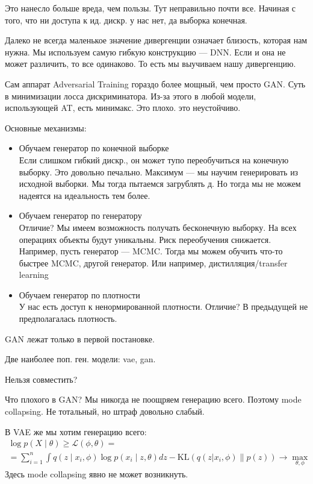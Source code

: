 \documentclass{book}
\begin{document}
Это нанесло больше вреда, чем пользы. Тут неправильно почти все. Начиная с того, что ни доступа к ид. дискр. у нас нет, да выборка конечная.

Далеко не всегда маленькое значение дивергенции означает близость, которая нам нужна. Мы используем самую гибкую конструкцию --- DNN. Если и она не может различить, то все одинаково. То есть мы выучиваем нашу дивергенцию.

Сам аппарат Adversarial Training гораздо более мощный, чем просто GAN. Суть в минимизации лосса дискриминатора. Из-за этого в любой модели, использующей AT, есть минимакс. Это плохо. это неустойчиво.

Основные механизмы:
\begin{itemize}
  \item Обучаем генератор по конечной выборке\\
    Если слишком гибкий дискр., он может тупо переобучиться на конечную выборку. Это довольно печально. Максимум --- мы научим генерировать из исходной выборки. Мы тогда пытаемся загрублять д. Но тогда мы не можем надеятся на идеальность тем более.\\
  \item Обучаем генератор по генератору\\
    Отличие? Мы имеем возможность получать бесконечную выборку. На всех операциях объекты будут уникальны. Риск переобучения снижается. Например, пусть генератор --- MCMC. Тогда мы можем обучить что-то быстрее MCMC, другой генератор. Или например, дистилляция/transfer learning\\
  \item Обучаем генератор по плотности\\
    У нас есть доступ к ненормированной плотности. Отличие? В предыдущей не предполагалась плотность.
\end{itemize}

GAN лежат только в первой постановке.

Две наиболее поп. ген. модели: vae, gan.

Нельзя совместить?

Что плохого в GAN? Мы никогда не поощряем генерацию всего. Поэтому mode collapsing. Не тотальный, но штраф довольно слабый.

В VAE же мы хотим генерацию всего:
\begin{gather*}
  \log p(X\mid \theta) \geq \mathcal{L}(\phi,\theta)=\\
  =\sum_{i=1}^{n} {\int {q(z\mid x_i,\phi)\log p(x_i\mid z,\theta)dz}-\mathrm{KL}(q(z|x_i,\phi)\|p(z))} \rightarrow \max_{\theta,\phi}
\end{gather*}
Здесь mode collapsing явно не может возникнуть.
\end{document}
